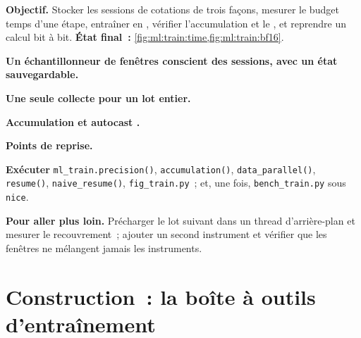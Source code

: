 \begin{tutorial}
\textbf{Objectif.} Stocker les sessions de cotations de trois façons, mesurer le budget temps d'une étape, entraîner en , vérifier l'accumulation et le
, et reprendre un calcul bit à bit. \textbf{État final~:} \cref{fig:ml:train:time,fig:ml:train:bf16}.
\begin{tutsteps}
\item \textbf{Un échantillonneur de fenêtres conscient des sessions, avec un état sauvegardable.}
\label{lst:ml:train:sampler}
\item \textbf{Une seule collecte pour un lot entier.}
\label{lst:ml:train:gather}
\item \textbf{Accumulation et autocast .}
\label{lst:ml:train:loop}
\item \textbf{Points de reprise.}
\label{lst:ml:train:ckpt}
\item \textbf{Exécuter} \texttt{ml\_train.precision()}, \texttt{accumulation()}, \texttt{data\_parallel()}, \texttt{resume()},
\texttt{naive\_resume()}, \texttt{fig\_train.py}~; et, une fois, \texttt{bench\_train.py} sous \texttt{nice}.
\end{tutsteps}
\textbf{Pour aller plus loin.} Précharger le lot suivant dans un thread d'arrière-plan et mesurer le recouvrement~; ajouter un second instrument
et vérifier que les fenêtres ne mélangent jamais les instruments.
\end{tutorial}

\section{Construction~: la boîte à outils d'entraînement}\label{bld:ml:training-infrastructure:mltrain}

